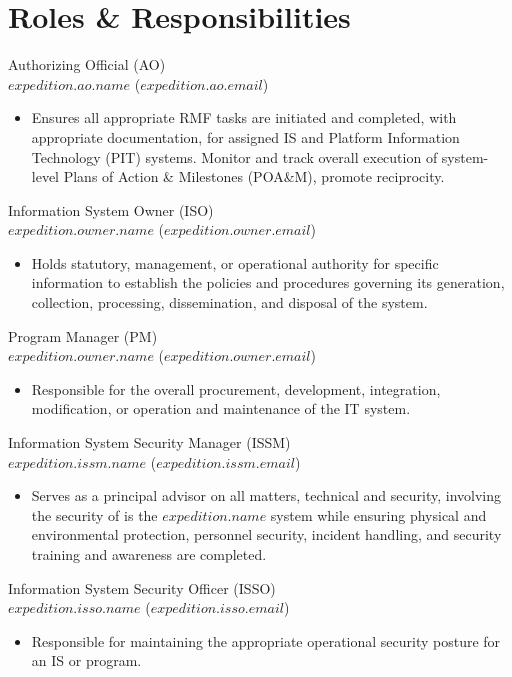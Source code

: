 \documentclass[11pt]{article}
\begin{document}
  \section*{Roles \& Responsibilities}
    Authorizing Official (AO) \\
    $expedition.ao.name$ ($expedition.ao.email$)
    \begin{itemize}
      \item Ensures all appropriate RMF tasks are initiated and completed, with appropriate documentation, for assigned IS and Platform Information Technology (PIT) systems. Monitor and track overall execution of system-level Plans of Action \& Milestones (POA\&M), promote reciprocity.
    \end{itemize}
    Information System Owner (ISO) \\
    $expedition.owner.name$ ($expedition.owner.email$)
    \begin{itemize}
      \item Holds statutory, management, or operational authority for specific information to establish the policies and procedures governing its generation, collection, processing, dissemination, and disposal of the system. 
    \end{itemize}
    Program Manager (PM) \\
    $expedition.owner.name$ ($expedition.owner.email$)
    \begin{itemize}
      \item Responsible for the overall procurement, development, integration, modification, or operation and maintenance of the IT system.
    \end{itemize}
    Information System Security Manager (ISSM) \\
    $expedition.issm.name$ ($expedition.issm.email$)
    \begin{itemize}
      \item Serves as a principal advisor on all matters, technical and security, involving the security of is the $expedition.name$ system while ensuring physical and environmental protection, personnel security, incident handling, and security training and awareness are completed.
    \end{itemize}
    Information System Security Officer (ISSO) \\
    $expedition.isso.name$ ($expedition.isso.email$)
   \begin{itemize}
      \item Responsible for maintaining the appropriate operational security posture for an IS or program.
    \end{itemize}
\end{document}
